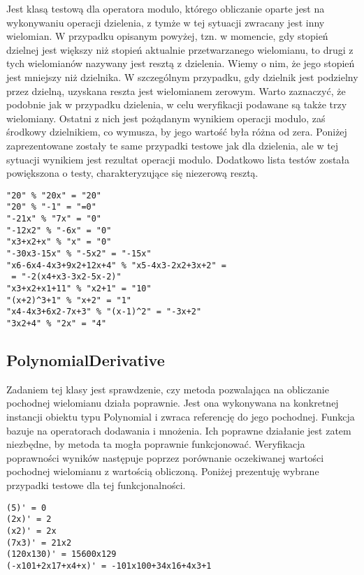Jest klasą testową dla operatora modulo, którego obliczanie oparte jest na wykonywaniu operacji dzielenia, z tymże w tej sytuacji zwracany jest inny wielomian. W przypadku opisanym powyżej, tzn. w momencie, gdy stopień dzielnej jest większy niż stopień aktualnie przetwarzanego wielomianu, to drugi z tych wielomianów nazywany jest resztą z dzielenia. Wiemy o nim, że jego stopień jest mniejszy niż dzielnika. W szczególnym przypadku, gdy dzielnik jest podzielny przez dzielną, uzyskana reszta jest wielomianem zerowym. Warto zaznaczyć, że podobnie jak w przypadku dzielenia, w celu weryfikacji podawane są także trzy wielomiany. Ostatni z nich jest pożądanym wynikiem operacji modulo, zaś środkowy dzielnikiem, co wymusza, by jego wartość była różna od zera. Poniżej zaprezentowane zostały te same przypadki testowe jak dla dzielenia, ale w tej sytuacji wynikiem jest rezultat operacji modulo. Dodatkowo lista testów została powiększona o testy, charakteryzujące się niezerową resztą.

\begin{lstlisting}
"20" % "20x" = "20"
"20" % "-1" = "=0"
"-21x" % "7x" = "0"
"-12x2" % "-6x" = "0"
"x3+x2+x" % "x" = "0"
"-30x3-15x" % "-5x2" = "-15x"
"x6-6x4-4x3+9x2+12x+4" % "x5-4x3-2x2+3x+2" =
 = "-2(x4+x3-3x2-5x-2)"
"x3+x2+x1+11" % "x2+1" = "10"
"(x+2)^3+1" % "x+2" = "1"
"x4-4x3+6x2-7x+3" % "(x-1)^2" = "-3x+2"
"3x2+4" % "2x" = "4"
\end{lstlisting}

\subsection{PolynomialDerivative}

Zadaniem tej klasy jest sprawdzenie, czy metoda pozwalająca na obliczanie pochodnej wielomianu działa poprawnie. Jest ona wykonywana na konkretnej instancji obiektu typu Polynomial i zwraca referencję do jego pochodnej. Funkcja bazuje na operatorach dodawania i mnożenia. Ich poprawne działanie jest zatem niezbędne, by metoda ta mogła poprawnie funkcjonować.
Weryfikacja poprawności wyników następuje poprzez porównanie oczekiwanej wartości pochodnej wielomianu z wartością obliczoną. Poniżej prezentuję wybrane przypadki testowe dla tej funkcjonalności.

\begin{lstlisting}
(5)' = 0
(2x)' = 2
(x2)' = 2x
(7x3)' = 21x2
(120x130)' = 15600x129
(-x101+2x17+x4+x)' = -101x100+34x16+4x3+1
\end{lstlisting}

